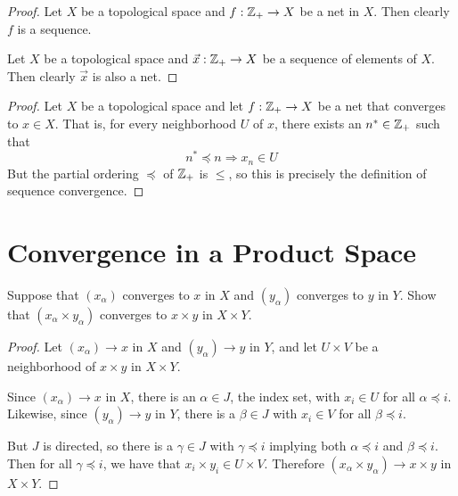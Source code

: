 \documentclass[12pt]{article}
\begin{document}
\begin{proof}
    Let $X$ be a topological space and $f : \mathbb{Z}_+ \to X$ be a net in $X$. Then clearly $f$ is a
    sequence.

    Let $X$ be a topological space and $\vec x : \mathbb{Z}_+ \to X$ be a sequence of elements of $X$. Then
    clearly $\vec x$ is also a net.
\end{proof}
\begin{proof}
    Let $X$ be a topological space and let $f : \mathbb{Z}_+ \to X$ be a net that converges to $x \in X$.
    That is, for every neighborhood $U$ of $x$, there exists an $n^* \in \mathbb{Z}_+$ such that
    \[ n^* \preceq n \Longrightarrow x_n \in U \]
    But the partial ordering $\preceq$ of $\mathbb{Z}_+$ is $\leq$, so this is precisely the definition of
    sequence convergence.
\end{proof}

\section{Convergence in a Product Space}
Suppose that $(x_\alpha)$ converges to $x$ in $X$ and $(y_\alpha)$ converges to $y$ in $Y$. Show
that $(x_\alpha \times y_\alpha)$ converges to $x \times y$ in $X \times Y$.
\begin{proof}
    Let $(x_\alpha) \to x$ in $X$ and $(y_\alpha) \to y$ in $Y$, and let $U \times V$ be a
    neighborhood of $x \times y$ in $X \times Y$.

    Since $(x_\alpha) \to x$ in $X$, there is an $\alpha \in J$, the index set, with $x_i \in U$
    for all $\alpha \preceq i$. Likewise, since $(y_\alpha) \to y$ in $Y$, there is a $\beta \in J$
    with $x_i \in V$ for all $\beta \preceq i$.

    But $J$ is directed, so there is a $\gamma \in J$ with $\gamma \preceq i$ implying both
    $\alpha \preceq i$ and $\beta \preceq i$. Then for all $\gamma \preceq i$, we have that
    $x_i \times y_i \in U \times V$. Therefore $(x_\alpha \times y_\alpha) \to x \times y$
    in $X \times Y$.
\end{proof}
\end{document}
